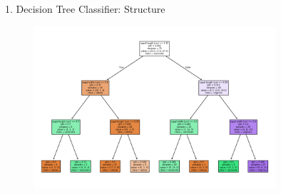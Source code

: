 \documentclass[aspectratio=169,xcolor=dvipsnames]{beamer}
\begin{document}
\begin{frame}{1. Decision Tree Classifier: Structure}

    \begin{figure}
        \centering
        \includegraphics[height=0.8\textheight, width=0.8\textwidth, keepaspectratio]{out/plot9_DT_structure.png}
        \label{fig:1}
    \end{figure}

\end{frame}
\end{document}
